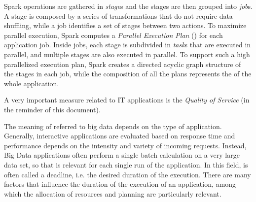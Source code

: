 
Spark  operations are gathered in \textit{stage}s and the stages are then grouped into \textit{job}s. A stage is composed by a series of transformations that do not require data shuffling, while a job identifies a set of stages between two actions. To maximize parallel execution, Spark computes a \textit{Parallel Execution Plan} (\plan) for each application job. Inside jobs, each stage is subdivided in \textit{task}s that are executed in parallel, and multiple stages are also executed in parallel. To support such a high parallelized execution plan, Spark creates a directed acyclic graph structure of the stages in each job, while the composition of all the plans represents the \plan of the whole application.




A very important measure related to IT applications is the \textit{Quality of Service} (\qos in the reminder of this document).

The meaning of \qos referred to big data depends on the type of application. Generally, interactive applications are evaluated based on response time and performance depends on the intensity and variety of incoming requests. Instead, Big Data applications often perform a single batch calculation on a very large data set, so that \qos is relevant for each single run of the application. In this field, \qos is often called a deadline, i.e. the desired duration of the execution. There are many factors that influence the duration of the execution of an application, among which the allocation of resources and planning are particularly relevant.

